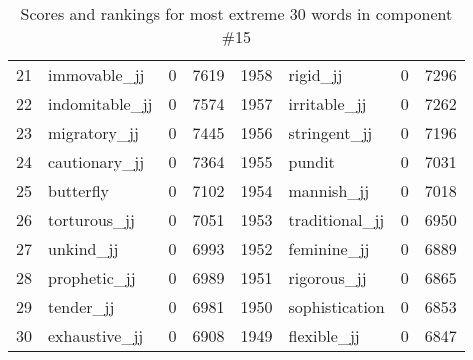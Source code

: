 \begin{table}[tbp]
\begin{tabular}{| rlr@{.}l | rlr@{.}l |}
    21 & immovable\_jj & 0 & 7619    &    1958 & rigid\_jj & 0 & 7296 \\
    22 & indomitable\_jj & 0 & 7574    &    1957 & irritable\_jj & 0 & 7262 \\
    23 & migratory\_jj & 0 & 7445    &    1956 & stringent\_jj & 0 & 7196 \\
    24 & cautionary\_jj & 0 & 7364    &    1955 & pundit & 0 & 7031 \\
    25 & butterfly & 0 & 7102    &    1954 & mannish\_jj & 0 & 7018 \\
    26 & torturous\_jj & 0 & 7051    &    1953 & traditional\_jj & 0 & 6950 \\
    27 & unkind\_jj & 0 & 6993    &    1952 & feminine\_jj & 0 & 6889 \\
    28 & prophetic\_jj & 0 & 6989    &    1951 & rigorous\_jj & 0 & 6865 \\
    29 & tender\_jj & 0 & 6981    &    1950 & sophistication & 0 & 6853 \\
    30 & exhaustive\_jj & 0 & 6908    &    1949 & flexible\_jj & 0 & 6847 \\
    \hline
    \end{tabular}
    \caption{Scores and rankings for most extreme 30 words in component \#15} 
\end{table}
\clearpage
